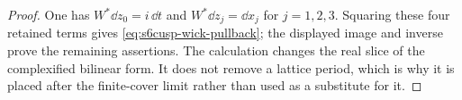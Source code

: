\begin{proof}
One has \(W^*\dd z_0=i\,\dd t\) and
\(W^*\dd z_j=\dd x_j\) for \(j=1,2,3\).  Squaring these four retained
terms gives \eqref{eq:s6cusp-wick-pullback}; the displayed image and inverse
prove the remaining assertions.  The calculation changes the real slice
of the complexified bilinear form.  It does not remove a lattice period,
which is why it is placed after the finite-cover limit rather than used as
a substitute for it.
\end{proof}
